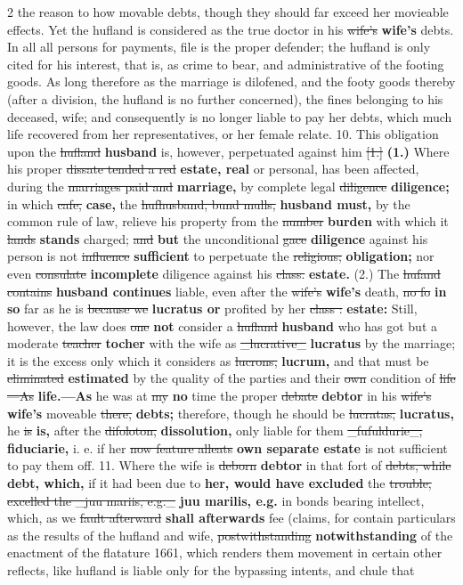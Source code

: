 \documentclass[10pt]{article}
\begin{document}
\begin{multicols}{2}
the reason to how movable debts, though they should far exceed her movieable effects. Yet the hufland is considered as the true doctor in his \sout{wife’s} \textbf{wife's} debts. In all all persons for payments, file is the proper defender; the hufland is only cited for his interest, that is, as crime to bear, and administrative of the footing goods. As long therefore as the marriage is dilofened, and the footy goods thereby (after a division, the hufland is no further concerned), the fines belonging to his deceased, wife; and consequently is no longer liable to pay her debts, which much life recovered from her representatives, or her female relate. 10. This obligation upon the \sout{hufland} \textbf{husband} is, however, perpetuated against him \sout{[1.]} \textbf{(1.)} Where his proper \sout{dissate tended a red} \textbf{estate, real} or personal, has been affected, during the \sout{marriages paid and} \textbf{marriage,} by complete legal \sout{diligence} \textbf{diligence;} in which \sout{cafe,} \textbf{case,} the \sout{hufhusband, bund mulls,} \textbf{husband must,} by the common rule of law, relieve his property from the \sout{number} \textbf{burden} with which it \sout{lands} \textbf{stands} charged; \sout{and} \textbf{but} the unconditional \sout{gace} \textbf{diligence} against his person is not \sout{influence} \textbf{sufficient} to perpetuate the \sout{religious;} \textbf{obligation;} nor even \sout{consulate} \textbf{incomplete} diligence against his \sout{class.} \textbf{estate.} (2.) The \sout{hufand contains} \textbf{husband continues} liable, even after the \sout{wife’s} \textbf{wife's} death, \sout{no fo} \textbf{in so} far as he is \sout{because we} \textbf{lucratus or} profited by her \sout{class :} \textbf{estate:} Still, however, the law does \sout{one} \textbf{not} consider a \sout{hufland} \textbf{husband} who has got but a moderate \sout{teacher} \textbf{tocher} with the wife as \sout{\_lucrative\_} \textbf{lucratus} by the marriage; it is the excess only which it considers as \sout{lucrons,} \textbf{lucrum,} and that must be \sout{eliminated} \textbf{estimated} by the quality of the parties and their \sout{own} condition of \sout{life—As} \textbf{life.—As} he was at \sout{my} \textbf{no} time the proper \sout{debate} \textbf{debtor} in his \sout{wife’s} \textbf{wife's} moveable \sout{there,} \textbf{debts;} therefore, though he should be \sout{lucratas,} \textbf{lucratus,} he \sout{is} \textbf{is,} after the \sout{difoloton,} \textbf{dissolution,} only liable for them \sout{\_fufuldurie\_,} \textbf{fiduciarie,} i. e. if her \sout{now feature alleats} \textbf{own separate estate} is not sufficient to pay them off. 11. Where the wife is \sout{deborn} \textbf{debtor} in that fort of \sout{debts, while} \textbf{debt, which,} if it had been due to \textbf{her, would have excluded} the \sout{trouble, excelled the \_juu mariis, e.g.\_} \textbf{juu marilis, e.g.} in bonds bearing intellect, which, as we \sout{fault afterward} \textbf{shall afterwards} fee (claims, for contain particulars as the results of the hufland and wife, \sout{postwithstanding} \textbf{notwithstanding} of the enactment of the flatature 1661, which renders them movement in certain other reflects, like hufland is liable only for the bypassing intents, and chule that 
\end{multicols}
\end{document}
